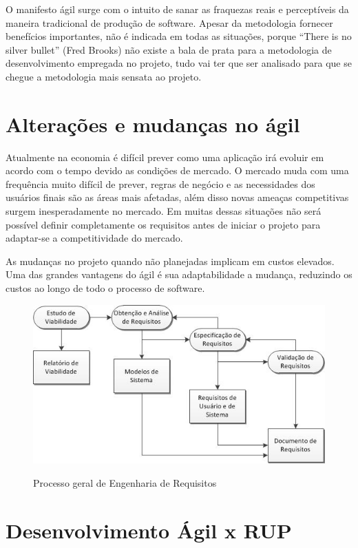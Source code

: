 O manifesto ágil surge com o intuito de sanar as fraquezas  reais e perceptíveis da maneira tradicional de produção de software. Apesar da metodologia fornecer benefícios importantes, não é indicada em todas as situações, porque “There is no silver bullet” (Fred Brooks) não existe a bala de prata para a metodologia de desenvolvimento empregada no projeto, tudo vai ter que ser analisado para que se chegue a metodologia mais sensata ao projeto.

\section{Alterações e mudanças no ágil}

Atualmente na economia é difícil prever como uma aplicação irá evoluir em acordo com o tempo devido as condições de mercado. O mercado muda com uma frequência muito difícil de prever, regras de negócio e as necessidades dos usuários finais são as áreas mais afetadas, além disso novas ameaças competitivas surgem inesperadamente no mercado. Em muitas dessas situações não será possível definir completamente os requisitos antes de iniciar o projeto para adaptar-se a competitividade do mercado.

As mudanças no projeto quando não planejadas implicam em custos elevados. Uma das grandes vantagens do ágil é sua adaptabilidade a mudança, reduzindo os custos ao longo de todo o processo de software.

\FloatBarrier
\begin{figure}[!htpd]
		\centering
		\includegraphics[scale=1.0]{figuras/processo_ER}
		\label{img:SAF}
		\caption{Processo geral de Engenharia de Requisitos}
\end{figure}
\FloatBarrier

\section{Desenvolvimento Ágil x RUP}

